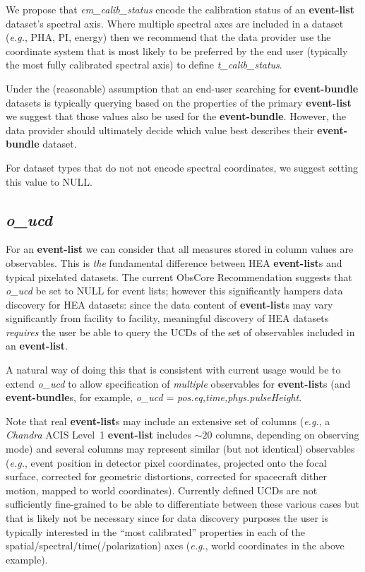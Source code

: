 \documentclass[11pt,a4paper]{ivoa}
\begin{document}
We propose that {\em em\_calib\_status}  encode the calibration status of an {\bf event-list} dataset's spectral axis.  Where multiple spectral axes are included in a dataset ({\em e.g.\/}, PHA, PI, energy) then we recommend that the data provider use the coordinate system that is most likely to be preferred by the end user (typically the most fully calibrated spectral axis) to define {\em t\_calib\_status\/}.

Under the (reasonable) assumption that an end-user searching for {\bf event-bundle} datasets is typically querying based on the properties of the primary {\bf event-list} we suggest that those values also be used for the {\bf event-bundle}.  However, the data provider should ultimately decide which value best describes their {\bf event-bundle} dataset.  

For dataset types that do not not encode spectral coordinates, we suggest setting this value to NULL\null.

\subsection{{\em o\_ucd}}

For an {\bf event-list} we can consider that all measures stored in column values are observables.  This is {\em the\/} fundamental difference between HEA {\bf event-list}s and typical pixelated datasets.  The current ObsCore Recommendation suggests that {\em o\_ucd\/} be set to NULL for event lists; however this significantly hampers data discovery for HEA datasets: since the data content of {\bf event-list}s may vary significantly from facility to facility, meaningful discovery of HEA datasets {\em requires\/} the user be able to query the UCDs of the set of observables included in an {\bf event-list}.

A natural way of doing this that is consistent with current usage would be to extend {\em o\_ucd\/} to allow specification of {\em multiple\/} observables for {\bf event-list}s (and {\bf event-bundle}s, for example, {\em o\_ucd\/} = {\em pos.eq,time,phys.pulseHeight\/}.

Note that real {\bf event-list}s may include an extensive set of columns ({\em e.g.\/}, a {\em Chandra\/} ACIS Level~1 {\bf event-list} includes $\sim\!20$ columns, depending on observing mode) and several columns may represent similar (but not identical) observables ({\em e.g.\/}, event position in detector pixel coordinates, projected onto the focal surface, corrected for geometric distortions, corrected for spacecraft dither motion, mapped to world coordinates).  Currently defined UCDs are not sufficiently fine-grained to be able to differentiate between these various cases but that is likely not be necessary since for data discovery purposes the user is typically interested in the ``most calibrated'' properties in each of the spatial/spectral/time(/polarization) axes ({\em e.g.\/}, world coordinates in the above example).
\end{document}
